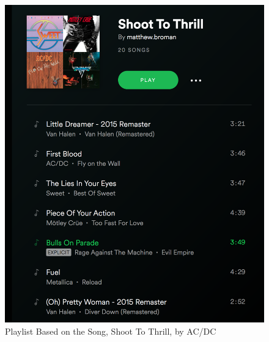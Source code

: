 \documentclass [letter,12pt] {article}
\begin{document}
        \begin{figure}[htp]
            \centering
            \includegraphics[width=\textwidth]{Created_Playlist.png}
            \caption{Playlist Based on the Song, Shoot To Thrill, by AC/DC}
            \label{fig:playlistshoottothrill}
        \end{figure}
        
\newpage
\end{document}
